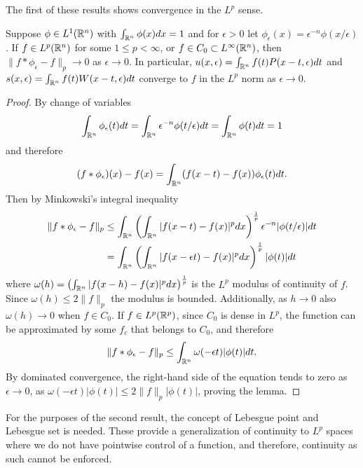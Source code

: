 The first of these results shows convergence in the $L^p$ sense.

\begin{lemma}\label{lemma:118}
    Suppose $\phi\in L^1(\mathbb R^n)$ with $\int_{\mathbb R^n}\phi(x)dx=1$ and for $\epsilon>0$ let $\phi_\epsilon(x)=\epsilon^{-n}\phi(x/\epsilon)$. If $f\in L^p(\mathbb R^n)$ for some $1\leq p<\infty$, or $f\in C_0\subset L^\infty(\mathbb R^n)$, then $\|f*\phi_\epsilon-f\|_p\rightarrow0$ as $\epsilon\rightarrow0$. In particular, $u(x,\epsilon)=\int_{\mathbb R^n}f(t)P(x-t,\epsilon)dt$ and $s(x,\epsilon)=\int_{\mathbb R^n}f(t)W(x-t,\epsilon)dt$ converge to $f$ in the $L^p$ norm as $\epsilon\rightarrow0$.
\end{lemma}
\begin{proof}
    By change of variables
    \begin{equation*}
        \int_{\mathbb R^n} \phi_{\epsilon}(t)dt=\int_{\mathbb R^n} \epsilon^{-n}\phi(t/\epsilon)dt=\int_{\mathbb R^n} \phi(t)dt=1
    \end{equation*}
    and therefore
    \begin{equation*}
        (f*\phi_\epsilon)(x)-f(x)=\int_{\mathbb R^n}(f(x-t)-f(x))\phi_\epsilon(t)dt.
    \end{equation*}
    Then by Minkowski's integral inequality
    \begin{align*}
        \|f*\phi_\epsilon-f\|_p&\leq\int_{\mathbb R^n}\left(\int_{\mathbb R^n}|f(x-t)-f(x)|^pdx\right)^{\frac{1}{p}}\epsilon^{-n}|\phi(t/\epsilon)|dt \\
        &=\int_{\mathbb R^n}\left(\int_{\mathbb R^n}|f(x-\epsilon t)-f(x)|^pdx\right)^{\frac{1}{p}}|\phi(t)|dt
    \end{align*}
    where $\omega(h)=\left(\int_{\mathbb R^n}|f(x-h)-f(x)|^pdx\right)^{\frac{1}{p}}$ is the $L^p$ modulus of continuity of $f$. Since $\omega(h)\leq2\|f\|_p$ the modulus is bounded. Additionally, as $h\rightarrow0$ also $\omega(h)\rightarrow0$ when $f\in C_0$. If $f\in L^p(\mathbb R^p)$, since $C_0$ is dense in $L^p$, the function can be approximated by some $f_c$ that belongs to $C_0$, and therefore
    \begin{equation*}
        \|f*\phi_\epsilon-f\|_p\leq\int_{\mathbb R^n}\omega(-\epsilon t)|\phi(t)|dt.
    \end{equation*}
    By dominated convergence, the right-hand side of the equation tends to zero as $\epsilon\rightarrow0$, as $\omega(-\epsilon t)|\phi(t)|\leq2\|f\|_p|\phi(t)|$, proving the lemma.
\end{proof}

For the purposes of the second result, the concept of Lebesgue point and Lebesgue set is needed. These provide a generalization of continuity to $L^p$ spaces where we do not have pointwise control of a function, and therefore, continuity as such cannot be enforced. 

